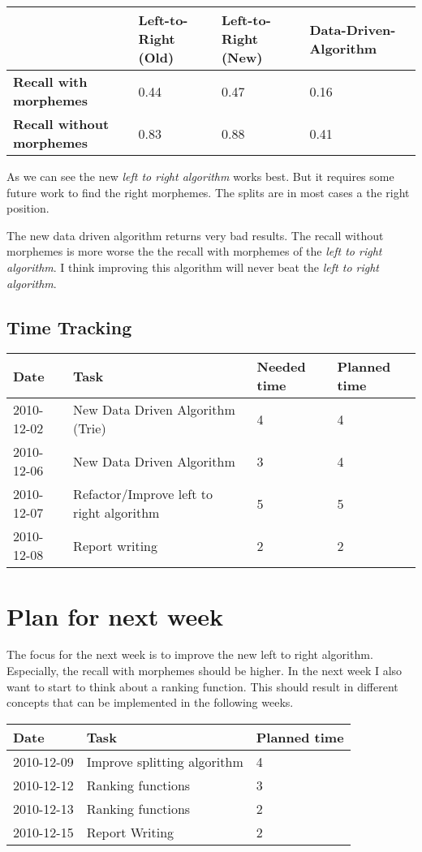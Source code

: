 \documentclass[11pt, accentcolor=tud9b, nochapname]{tudexercise}
\begin{document}
\vspace{10pt}
\begin{tabular}{l | l | l | l }
  \hline
  \textbf{ } & \textbf{Left-to-Right (Old)} & \textbf{Left-to-Right (New)} & \textbf{Data-Driven-Algorithm} \\ \hline
  \textbf{Recall with morphemes} & 0.44 & 0.47 & 0.16 \\ \hline
  \textbf{Recall without morphemes} & 0.83 & 0.88 & 0.41 \\ \hline
\end{tabular}
\vspace{10pt}

As we can see the new \emph{left to right algorithm} works best. But it requires some future work to find the right morphemes. The splits are in most cases a the right position.

The new data driven algorithm returns very bad results. The recall without morphemes is more worse the the recall with morphemes of the \emph{left to right algorithm}. I think improving this algorithm will never beat the \emph{left to right algorithm}.

\subsection{Time Tracking}

\begin{tabular}{l | l | l | l}
  \hline
  \textbf{Date} & \textbf{Task} & \textbf{Needed time} & \textbf{Planned time} \\ \hline
  2010-12-02 & New Data Driven Algorithm (Trie) & 4 & 4 \\ \hline
  2010-12-06 & New Data Driven Algorithm & 3 & 4 \\ \hline
  2010-12-07 & Refactor/Improve left to right algorithm & 5 & 5 \\ \hline
  2010-12-08 & Report writing & 2 & 2  \\ \hline
\end{tabular}

\section{Plan for next week}
The focus for the next week is to improve the new left to right algorithm. Especially, the recall with morphemes should be higher. In the next week I also want to start to think about a ranking function. This should result in different concepts that can be implemented in the following weeks.

\vspace{10pt}
\begin{tabular}{l | l | l}
  \hline
  \textbf{Date} & \textbf{Task} & \textbf{Planned time} \\ \hline
  2010-12-09 & Improve splitting algorithm & 4 \\ \hline
  2010-12-12 & Ranking functions & 3 \\ \hline
  2010-12-13 & Ranking functions & 2 \\ \hline
  2010-12-15 & Report Writing & 2 \\ \hline
\end{tabular}
\end{document}

